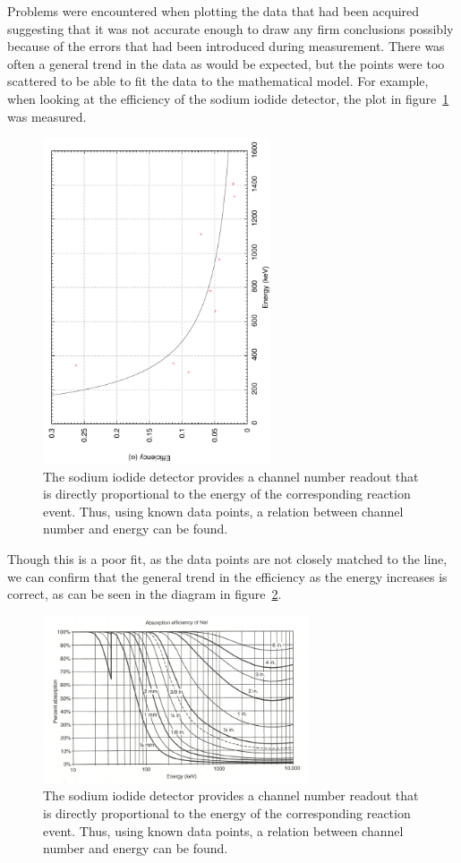 Problems were encountered when plotting the data that had been acquired suggesting that it was not accurate enough to draw any firm conclusions possibly because of the errors that had been introduced during measurement. There was often a general trend in the data as would be expected, but the points were too scattered to be able to fit the data to the mathematical model. For example, when looking at the efficiency of the sodium iodide detector, the plot in figure~\ref{fig:NaIefficiancy} was measured.
\begin{figure}[ht]
	\centering
	\includegraphics[angle=270,width=0.6\textwidth]{NaIEfficiency.pdf}
	\caption{The sodium iodide detector provides a channel number readout that is directly proportional to the energy of the corresponding reaction event. Thus, using known data points, a relation between channel number and energy can be found.\label{fig:NaIefficiancy}}
\end{figure}
Though this is a poor fit, as the data points are not closely matched to the line, we can confirm that the general trend in the efficiency as the energy increases is correct, as can be seen in the diagram in figure~\ref{fig:efficiencyKrane}\cite{krane}.
\begin{figure}[ht]
	\centering
	\includegraphics[width=0.7\textwidth]{EfficiencyKrane.pdf}
	\caption{The sodium iodide detector provides a channel number readout that is directly proportional to the energy of the corresponding reaction event. Thus, using known data points, a relation between channel number and energy can be found.\label{fig:efficiencyKrane}}
\end{figure}

